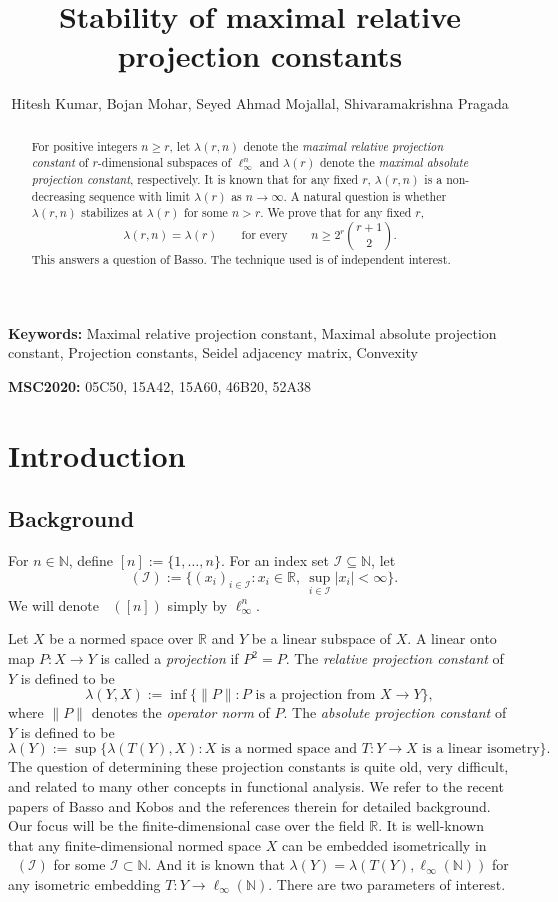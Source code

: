 \documentclass[11pt]{article}
\title{\textbf{Stability of maximal relative projection constants}}
\author{Hitesh Kumar, Bojan Mohar, Seyed Ahmad Mojallal, Shivaramakrishna Pragada}
\date{}
\theoremstyle{plain}
\numberwithin{equation}{section}
\DeclareMathOperator{\lin}{\ell_{\infty}}
\begin{document}
\maketitle
\begin{abstract} For positive integers $n\ge r$, let $\lambda(r,n)$ denote the \emph{maximal relative projection constant} of $r$-dimensional subspaces of $\ell_\infty^n$ and $\lambda(r)$ denote the \emph{maximal absolute projection constant}, respectively. It is known that for any fixed $r$, $\lambda(r,n)$ is a non-decreasing sequence with limit $\lambda(r)$ as $n\to \infty$. A natural question is whether $\lambda(r,n)$ stabilizes at $\lambda(r)$ for some $n>r$. We prove that for any fixed $r$, 
\[\lambda(r,n)=\lambda(r)
\qquad\text{for every}\qquad
n\ge 2^{r}\binom{r+1}{2}.\] 
This answers a question of Basso. The technique used is of independent interest. 
\end{abstract}

\noindent
\textbf{Keywords:} Maximal relative projection constant, Maximal absolute projection constant, Projection constants, Seidel adjacency matrix, Convexity    

\noindent
\textbf{MSC2020:} 05C50, 15A42, 15A60, 46B20, 52A38

\section{Introduction}

\subsection{Background}

For $n\in \mathbb{N}$, define $[n]:=\{1, \ldots, n\}$. For an index set $\mathcal{I}\subseteq \mathbb{N}$, let
\[\lin(\mathcal{I}):=\{(x_i)_{i\in \mathcal{I}}: x_i\in \mathbb{R},\  \sup_{i\in \mathcal{I}} |x_i| < \infty \}.\]
We will denote $\lin([n])$ simply by $\ell_\infty^n$. 

Let $X$ be a normed space over $\mathbb{R}$ and $Y$ be a linear subspace of $X$. A linear onto map $P:X\to Y$ is called a \emph{projection} if $P^2 = P$. The \emph{relative projection constant} of $Y$ is defined to be 
\[ \lambda(Y, X):=\inf \{\|P\| : P \text{ is a projection from }X\to Y\},\]
where $\|P\|$ denotes the \emph{operator norm} of $P$. The \emph{absolute projection constant} of $Y$ is defined to be 
\[ \lambda(Y):=\sup \{\lambda(T(Y), X): X \text{ is a normed space and } T:Y\to X \text{ is a linear isometry}\}.\]
The question of determining these projection constants is quite old, very difficult, and related to many other concepts in functional analysis. We refer to the recent papers of Basso \cite{Basso_2019} and Kobos \cite{Kobos_2025} and the references therein for detailed background. Our focus will be the finite-dimensional case over the field $\mathbb{R}$. It is well-known that any finite-dimensional normed space $X$ can be embedded isometrically in $\lin(\mathcal{I})$ for some $\mathcal{I}\subset \mathbb{N}$. And it is known that $\lambda(Y) = \lambda(T(Y), \ell_\infty(\mathbb{N}))$ for any isometric embedding $T:Y\to \ell_\infty(\mathbb{N})$. There are two parameters of interest.  
\end{document}
